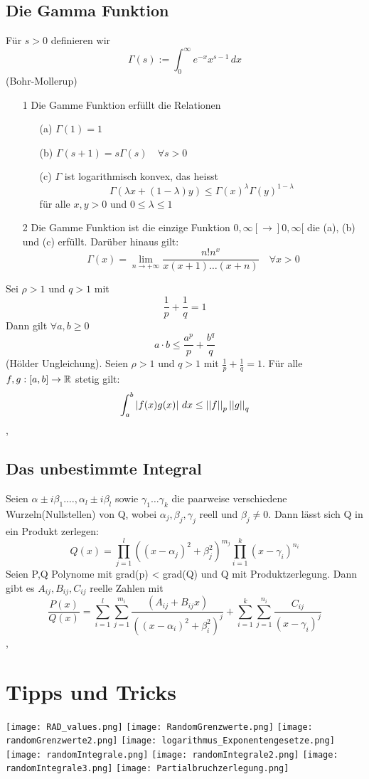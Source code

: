 \subsection{Die Gamma Funktion}
\Def[5.59] Für \(s > 0\) definieren wir
\[ \Gamma(s) := \int_{0}^{\infty} e^{-x}x^{s-1} \,dx\]
\Satz[5.60](Bohr-Mollerup)
\begin{enumerate}
    \item [1] Die Gamme Funktion erfüllt die Relationen
    \begin{enumerate}
        \item [(a)] \( \Gamma(1) = 1\)
        \item [(b)] \(\Gamma(s+1) = s\Gamma(s) \quad \forall s > 0 \)
        \item [(c)] \( \Gamma\) ist logarithmisch konvex, das heisst
        \[\Gamma( \lambda x + (1 - \lambda)y) \leq \Gamma(x)^{\lambda}\Gamma(y)^{1-\lambda}\]
        für alle \(x,y > 0\) und \(0 \leq \lambda \leq 1\)
    \end{enumerate}
    \item [2] Die Gamme Funktion ist die einzige Funktion \( 0, \infty[ \rightarrow ]0, \infty [\) die (a), (b) und (c) erfüllt. Darüber hinaus gilt:
    \[\Gamma(x) = \lim\limits_{n \rightarrow +\infty} \frac{n!n^x}{x(x+1) \dots (x+n)} \quad \forall x > 0\] 
\end{enumerate}
\Lemma[5.61] Sei \( \rho > 1\) und \(q > 1\) mit
\[ \frac{1}{p} + \frac{1}{q} = 1\]
Dann gilt \(\forall a,b \geq 0 \)
\[ a \cdot b \leq \frac{a^p}{p} + \frac{b^q}{q}\]
\Satz[5.62](Hölder Ungleichung). Seien \( \rho > 1\) und \( q > 1\) mit \( \frac{1}{p} + \frac{1}{q} = 1\). Für alle \(f,g : [a,b] \rightarrow \mathbb{R} \) stetig gilt:
\[ \int_{a}^{b} \left\lvert f(x)g(x) \right\rvert \,dx \leq \left\lvert \left\lvert f \right\rvert \right\rvert_p \left\lvert \left\lvert g \right\rvert \right\rvert_q\]
\sep
\subsection{Das unbestimmte Integral}
\Def[Produktzerlegung]
Seien \( \alpha \pm i\beta_1. \dots , \alpha_l \pm i\beta_l\) sowie \( \gamma_1 \dots \gamma_k \) die paarweise verschiedene Wurzeln(Nullstellen) von Q,
wobei \( \alpha_j, \beta_j, \gamma_j\) reell und \(\beta_j \neq 0\). Dann lässt sich Q in ein Produkt zerlegen:
\[ Q(x) = \prod_{j=1}^l ((x- \alpha_j)^2 + \beta_j^2)^{m_j} \prod_{i=1}^k (x - \gamma_i)^{n_i}\]
\Satz[5.65] Seien P,Q Polynome mit grad(p) < grad(Q) und Q mit Produktzerlegung. Dann gibt es \( A_{ij}, B_{ij}, C_{ij}\) reelle Zahlen mit
\[ \frac{P(x)}{Q(x)} = \sum_{i=1}^l \sum_{j=1}^{m_i} \frac{(A_{ij} + B_{ij}x)}{((x - \alpha_i)^2 + \beta_i^2)^j} + \sum_{i=1}^k \sum_{j=1}^{n_i} \frac{C_{ij}}{(x - \gamma_i)^j}\]
\sep
\section{Tipps und Tricks}
\texttt{[image: RAD\_values.png]}
\texttt{[image: RandomGrenzwerte.png]}
\texttt{[image: randomGrenzwerte2.png]}
\texttt{[image: logarithmus\_Exponentengesetze.png]}
\texttt{[image: randomIntegrale.png]}
\texttt{[image: randomIntegrale2.png]}
\texttt{[image: randomIntegrale3.png]}
\texttt{[image: Partialbruchzerlegung.png]}